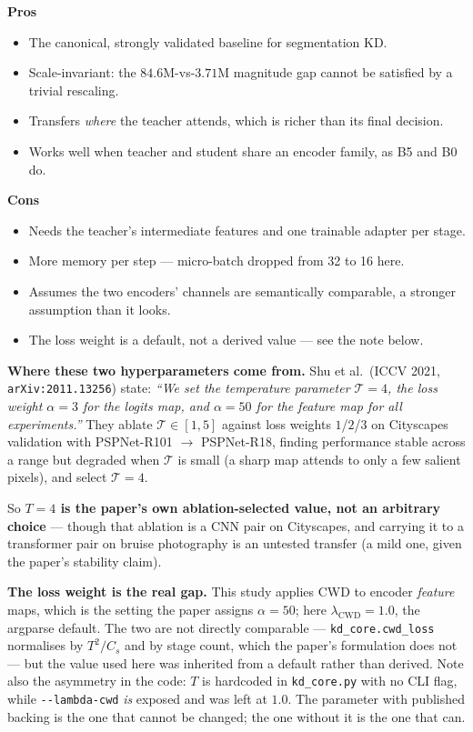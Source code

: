 \documentclass[11pt]{article}
\newcommand{\pro}[1]{\item[\textcolor{proscol}{$+$}] #1}
\newcommand{\con}[1]{\item[\textcolor{conscol}{$-$}] #1}
\begin{document}
\begin{minipage}[t]{0.475\textwidth}
\textbf{\textcolor{proscol}{Pros}}
\begin{itemize}[leftmargin=1.5em,itemsep=1pt,label={},labelwidth=1em,labelsep=0.4em,align=left]
  \pro{The canonical, strongly validated baseline for segmentation KD.}
  \pro{Scale-invariant: the $84.6$M-vs-$3.71$M magnitude gap cannot be satisfied by a trivial
       rescaling.}
  \pro{Transfers \emph{where} the teacher attends, which is richer than its final decision.}
  \pro{Works well when teacher and student share an encoder family, as B5 and B0 do.}
\end{itemize}
\end{minipage}\hfill%
\begin{minipage}[t]{0.475\textwidth}
\textbf{\textcolor{conscol}{Cons}}
\begin{itemize}[leftmargin=1.5em,itemsep=1pt,label={},labelwidth=1em,labelsep=0.4em,align=left]
  \con{Needs the teacher's intermediate features and one trainable adapter per stage.}
  \con{More memory per step --- micro-batch dropped from 32 to 16 here.}
  \con{Assumes the two encoders' channels are semantically comparable, a stronger assumption than
       it looks.}
  \con{The loss weight is a default, not a derived value --- see the note below.}
\end{itemize}
\end{minipage}

\vspace{4pt}
\begin{warnbox}
\textbf{Where these two hyperparameters come from.} Shu et al.\ (ICCV 2021,
\texttt{arXiv:2011.13256}) state: \emph{``We set the
temperature parameter $\mathcal{T}=4$, the loss weight $\alpha=3$ for the logits map, and
$\alpha=50$ for the feature map for all experiments.''} They ablate $\mathcal{T}\in[1,5]$ against
loss weights $1$/$2$/$3$ on Cityscapes validation with PSPNet-R101 $\to$ PSPNet-R18, finding
performance stable across a range but degraded when $\mathcal{T}$ is small (a sharp map attends to
only a few salient pixels), and select $\mathcal{T}=4$.

So \textbf{$T=4$ is the paper's own ablation-selected value, not an arbitrary choice} --- though
that ablation is a CNN pair on Cityscapes, and carrying it to a transformer pair on bruise
photography is an untested transfer (a mild one, given the paper's stability claim).

\textbf{The loss weight is the real gap.} This study applies CWD to encoder \emph{feature} maps,
which is the setting the paper assigns $\alpha=50$; here $\lambda_{\mathrm{CWD}}=1.0$, the argparse
default. The two are not directly comparable --- \texttt{kd\_core.cwd\_loss} normalises by
$T^2/C_s$ and by stage count, which the paper's formulation does not --- but the value used here
was inherited from a default rather than derived. Note also the asymmetry in the code: $T$ is
hardcoded in \texttt{kd\_core.py} with no CLI flag, while \texttt{-{}-lambda-cwd} \emph{is}
exposed and was left at $1.0$. The parameter with published backing is the one that cannot be
changed; the one without it is the one that can.
\end{warnbox}
\end{document}
